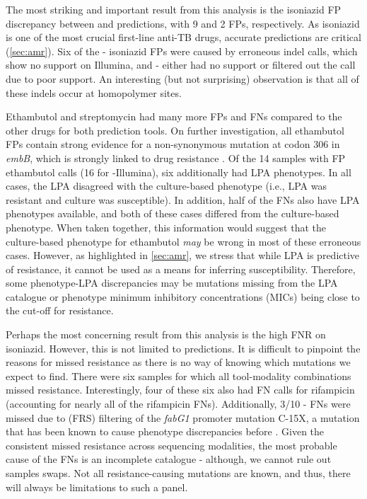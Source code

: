 The most striking and important result from this analysis is the isoniazid FP discrepancy between \mykrobe{} and \drprg{} \ont{} predictions, with 9 and 2 FPs, respectively. As isoniazid is one of the most crucial first-line anti-TB drugs, accurate predictions are critical (\autoref{sec:amr}). Six of the \mykrobe{}-\ont{} isoniazid FPs were caused by erroneous indel calls, which show no support on Illumina, and \drprg{}-\ont{} either had no support or filtered out the call due to poor support. An interesting (but not surprising) observation is that all of these indels occur at homopolymer sites.

Ethambutol and streptomycin had many more FPs and FNs compared to the other drugs for both prediction tools. On further investigation, all ethambutol FPs contain strong evidence for a non-synonymous mutation at codon 306 in \textit{embB}, which is strongly linked to drug resistance \cite{Maningi2017,Srivastava2009,Brossier2015}. Of the 14 samples with FP ethambutol calls (16 for \mykrobe{}-Illumina), six additionally had LPA phenotypes. In all cases, the LPA disagreed with the culture-based phenotype (i.e., LPA was resistant and culture was susceptible). In addition, half of the FNs also have LPA phenotypes available, and both of these cases differed from the culture-based phenotype. When taken together, this information would suggest that the culture-based phenotype for ethambutol \emph{may} be wrong in most of these erroneous cases. However, as highlighted in \autoref{sec:amr}, we stress that while LPA is predictive of resistance, it cannot be used as a means for inferring susceptibility. Therefore, some phenotype-LPA discrepancies may be mutations missing from the LPA catalogue or phenotype minimum inhibitory concentrations (MICs) being close to the cut-off for resistance.

Perhaps the most concerning result from this analysis is the high FNR on isoniazid. However, this is not limited to \ont{} predictions. It is difficult to pinpoint the reasons for missed resistance as there is no way of knowing which mutations we expect to find. There were six samples for which all tool-modality combinations missed resistance. Interestingly, four of these six also had FN calls for rifampicin (accounting for nearly all of the rifampicin FNs). Additionally, 3/10 \drprg{}-\ont{} FNs were missed due to (FRS) filtering of the \textit{fabG1} promoter mutation C-15X, a mutation that has been known to cause phenotype discrepancies before \cite{cryptic2018}. Given the consistent missed resistance across sequencing modalities, the most probable cause of the FNs is an incomplete catalogue - although, we cannot rule out samples swaps. Not all resistance-causing mutations are known, and thus, there will always be limitations to such a panel.

